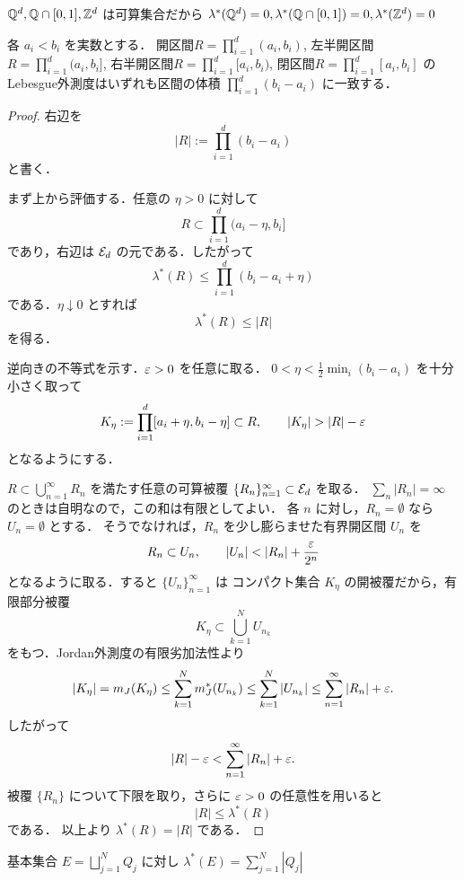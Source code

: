 \begin{example}
    $\mathbb Q^d, \mathbb Q \cap [0,1], \mathbb Z^d$ は可算集合だから $\lambda^*(\mathbb Q^d)=0, \lambda^*(\mathbb Q \cap [0,1]) = 0, \lambda^*(\mathbb Z^d)=0$
\end{example}
\begin{proposition}\label{prop:interval-outer-measure-volume}
各 $a_i<b_i$ を実数とする．
開区間$R=\prod_{i=1}^d (a_i,b_i)$,
左半開区間$R=\prod_{i=1}^d (a_i,b_i]$,
右半開区間$R=\prod_{i=1}^d [a_i,b_i)$,
閉区間$R=\prod_{i=1}^d [a_i,b_i]$
のLebesgue外測度はいずれも区間の体積 $\prod_{i=1}^d (b_i - a_i)$ に一致する．
\end{proposition}
\begin{proof}
右辺を
\[
|R|:=\prod_{i=1}^d (b_i-a_i)
\]
と書く．

まず上から評価する．任意の $\eta>0$ に対して
\[
R\subset \prod_{i=1}^d (a_i-\eta,b_i]
\]
であり，右辺は $\mathcal E_d$ の元である．したがって
\[
\lambda^*(R)
\le
\prod_{i=1}^d (b_i-a_i+\eta)
\]
である．$\eta\downarrow0$ とすれば
\[
\lambda^*(R)\le |R|
\]
を得る．

逆向きの不等式を示す．$\varepsilon>0$ を任意に取る．
$0<\eta<\frac12\min_i(b_i-a_i)$ を十分小さく取って
\[
K_\eta:=\prod_{i=1}^d [a_i+\eta,b_i-\eta]\subset R,
\qquad
|K_\eta|>|R|-\eps
\]
となるようにする．

$R\subset\bigcup_{n=1}^{\infty}R_n$ を満たす任意の可算被覆
$\{R_n\}_{n=1}^{\infty}\subset\mathcal E_d$ を取る．
$\sum_n |R_n|=\infty$ のときは自明なので，この和は有限としてよい．
各 $n$ に対し，$R_n=\emptyset$ なら $U_n=\emptyset$ とする．
そうでなければ，$R_n$ を少し膨らませた有界開区間 $U_n$ を
\[
R_n\subset U_n,
\qquad
|U_n|<|R_n|+\frac{\eps}{2^n}
\]
となるように取る．すると $\{U_n\}_{n=1}^{\infty}$ は
コンパクト集合 $K_\eta$ の開被覆だから，有限部分被覆
\[
K_\eta\subset \bigcup_{k=1}^{N}U_{n_k}
\]
をもつ．Jordan外測度の有限劣加法性より
\[
|K_\eta|
=m_J(K_\eta)
\le
\sum_{k=1}^{N}m_J^*(U_{n_k})
\le
\sum_{k=1}^{N}|U_{n_k}|
\le
\sum_{n=1}^{\infty}|R_n|+\varepsilon.
\]
したがって
\[
|R|-\varepsilon
<
\sum_{n=1}^{\infty}|R_n|+\varepsilon.
\]
被覆 $\{R_n\}$ について下限を取り，さらに $\varepsilon>0$ の任意性を用いると
\[
|R|\le \lambda^*(R)
\]
である．
以上より $\lambda^*(R)=|R|$ である．
\end{proof}
\begin{example}
    基本集合 $E = \bigsqcup_{j=1}^N Q_j$ に対し $\lambda^*(E) = \sum_{j=1}^N |Q_j|$
\end{example}

